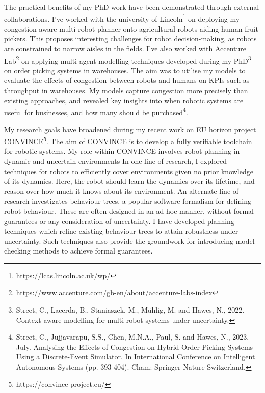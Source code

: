 \documentclass[11pt]{article}
\begin{document}
The practical benefits of my PhD work have been demonstrated through external collaborations.
%
I've worked with the university of Lincoln\footnote{https://lcas.lincoln.ac.uk/wp/} on deploying my congestion-aware multi-robot planner onto agricultural robots aiding human fruit pickers.
%
This proposes interesting challenges for robot decision-making, as robots are constrained to narrow aisles in the fields.
%
I've also worked with Accenture Lab\footnote{https://www.accenture.com/gb-en/about/accenture-labs-index} on applying multi-agent modelling techniques developed during my PhD\footnote{Street, C., Lacerda, B., Staniaszek, M., Mühlig, M. and Hawes, N., 2022. Context-aware modelling for multi-robot systems under uncertainty.} on order picking systems in warehouses.
%
The aim was to utilise my models to evaluate the effects of congestion between robots and humans on KPIs such as throughput in warehouses.
%
My models capture congestion more precisely than existing approaches, and revealed key insights into when robotic systems are useful for businesses, and how many should be purchased\footnote{Street, C., Jujjavarapu, S.S., Chen, M.N.A., Paul, S. and Hawes, N., 2023, July. Analysing the Effects of Congestion on Hybrid Order Picking Systems Using a Discrete-Event Simulator. In International Conference on Intelligent Autonomous Systems (pp. 393-404). Cham: Springer Nature Switzerland.}.


My research goals have broadened during my recent work on EU horizon project CONVINCE\footnote{https://convince-project.eu/}.
%
The aim of CONVINCE is to develop a fully verifiable toolchain for robotic systems.
%
My role within CONVINCE involves robot planning in dynamic and uncertain environments
%
In one line of research, I explored techniques for robots to efficiently cover environments given no prior knowledge of its dynamics.
%
Here, the robot should learn the dynamics over its lifetime, and reason over how much it knows about its environment.
%
An alternate line of research investigates behaviour trees, a popular software formalism for defining robot behaviour.
%
These are often designed in an ad-hoc manner, without formal guarantees or any consideration of uncertainty.
%
I have developed planning techniques which refine existing behaviour trees to attain robustness under uncertainty.
%
Such techniques also provide the groundwork for introducing model checking methods to achieve formal guarantees.

\end{document}
